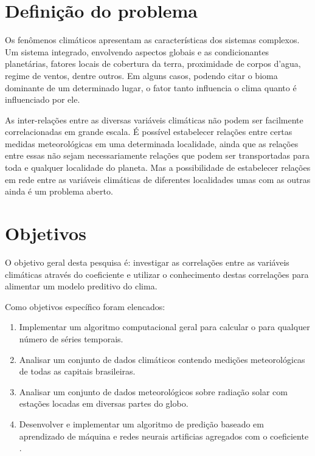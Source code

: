 \section{Definição do problema}
\label{sec:problema}

Os fenômenos climáticos apresentam as características dos sistemas complexos. Um sistema integrado, envolvendo aspectos globais e as condicionantes planetárias, fatores locais de cobertura da terra, proximidade de corpos d'agua, regime de ventos, dentre outros. Em alguns casos, podendo citar o bioma dominante de um determinado lugar, o fator tanto influencia o clima quanto é influenciado por ele.

As inter-relações entre as diversas variáveis climáticas não podem ser facilmente correlacionadas em grande escala. É possível estabelecer relações entre certas medidas meteorológicas em uma determinada localidade, ainda que as relações entre essas não sejam necessariamente relações que podem ser transportadas para toda e qualquer localidade do planeta. Mas a possibilidade de estabelecer relações em rede entre as variáveis climáticas de diferentes localidades umas com as outras ainda é um problema aberto.

\section{Objetivos}
\label{sec:Objetivos}

O objetivo geral desta pesquisa é: investigar as correlações entre as variáveis climáticas através do coeficiente \dmc e utilizar o conhecimento destas correlações para alimentar um modelo preditivo do clima.

Como objetivos específico foram elencados:

\begin{enumerate}
    \label{enum:obj_espec}
    \item Implementar um algoritmo computacional geral para calcular o \dmc para qualquer número de séries temporais.
    \item Analisar um conjunto de dados climáticos contendo medições meteorológicas de todas as capitais brasileiras.
    \item Analisar um conjunto de dados meteorológicos sobre radiação solar com estações locadas em diversas partes do globo.
    \item Desenvolver e implementar um algoritmo de predição baseado em aprendizado de máquina e redes neurais artificias agregados com o coeficiente \dmc.
\end{enumerate}

